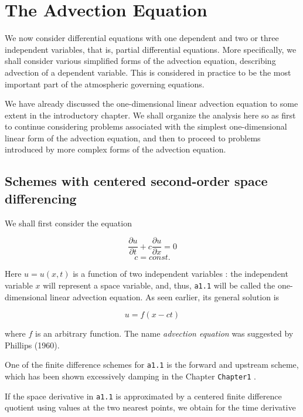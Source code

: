 \section{The Advection Equation}\label{Chapter3}

We now consider differential equations with one dependent and two or
three independent variables, that is, partial differential equations.
More specifically, we shall consider various simplified forms of the
advection equation, describing advection of a dependent variable. This
is considered in practice to be the most important part of the
atmospheric governing equations.

We have already discussed the one-dimensional linear advection equation
to some extent in the introductory chapter. We shall organize the
analysis here so as first to continue considering problems associated
with the simplest one-dimensional linear form of the advection equation,
and then to proceed to problems introduced by more complex forms of the
advection equation.

\subsection{\texorpdfstring{\textbf{Schemes with centered second-order
space
differencing}}{Schemes with centered second-order space differencing}}\label{Section3.1}

We shall first consider the equation

 {\[\frac{\partial u}{\partial t}  +c\frac{\partial u}{\partial x} = 0\]\[c = const.\]}

Here \(u = u\left( x,t \right)\) is a function of two independent
variables : the independent variable \(x\) will represent a space
variable, and, thus, \texttt{a1.1} will be called the one-dimensional
linear advection equation. As seen earlier, its general solution is

 {\[u = f\left( x - ct \right)\]}

where \(f\) is an arbitrary function. The name \emph{advection equation}
was suggested by Phillips (1960).

One of the finite difference schemes for \texttt{a1.1} is the forward
and upstream scheme, which has been shown excessively damping in the
Chapter \texttt{Chapter1} .

If the space derivative in \texttt{a1.1} is approximated by a centered
finite difference quotient using values at the two nearest points, we
obtain for the time derivative

